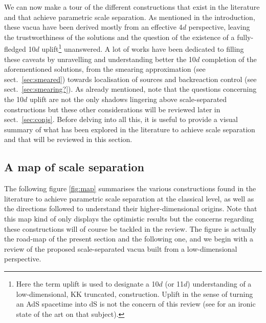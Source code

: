 \documentclass[11pt, a4paper]{article}
\begin{document}
We can now make a tour of the different constructions that exist in the literature and that achieve parametric scale separation. As mentioned in the introduction, these vacua have been derived mostly from an effective 4$d$ perspective, leaving the trustworthiness of the solutions and the question of the existence of a fully-fledged 10$d$ uplift\footnote{Here the term uplift is used to designate a 10$d$ (or 11$d$) understanding of a low-dimensional, KK truncated, construction. Uplift in the sense of turning an AdS spacetime into dS is not the concern of this review (see \cite{Bena:2023sks} for an ironic state of the art on that subject).} unanswered. A lot of works have been dedicated to filling these caveats by unravelling and understanding better the 10$d$ completion of the aforementioned solutions, from the smearing approximation (see sect.~\ref{sec:smeared}) towards localisation of sources and backreaction control (see sect.~\ref{sec:smearing?}). As already mentioned, note that the questions concerning the 10$d$ uplift are not the only shadows lingering above scale-separated constructions but these other considerations will be reviewed later in sect.~\ref{sec:conjs}. Before delving into all this, it is useful to provide a visual summary of what has been explored in the literature to achieve scale separation and that will be reviewed in this section.

\subsection{A map of scale separation}

The following figure \ref{fig:map} summarises the various constructions found in the literature to achieve parametric scale separation at the classical level, as well as the directions followed to understand their higher-dimensional origins. Note that this map kind of only displays the optimistic results but the concerns regarding these constructions will of course be tackled in the review. The figure is actually the road-map of the present section and the following one, and we begin with a review of the proposed scale-separated vacua built from a low-dimensional perspective.
\end{document}
